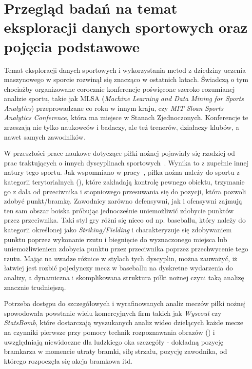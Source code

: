 
\chapter{Przegląd badań na temat eksploracji danych sportowych oraz pojęcia podstawowe}
Temat eksploracji danych sportowych i wykorzystania metod z dziedziny uczenia maszynowego w sporcie rozwinął się znacząco w ostatnich latach. Świadczą o tym chociażby organizowane corocznie konferencje poświęcone szeroko rozumianej analizie sportu, takie jak MLSA (\textit{Machine Learning and Data Mining for Sports Analytics}) przeprowadzane co roku w innym kraju, czy \textit{MIT Sloan Sports Analytics Conference}, która ma miejsce w Stanach Zjednoczonych. Konferencje te zrzeszają nie tylko naukowców i badaczy, ale też trenerów, działaczy klubów, a nawet samych zawodników.

W przeszłości prace naukowe dotyczące piłki nożnej pojawiały się rzadziej od prac traktujących o innych dyscyplinach sportowych~\cite{ml_soccer_analytics}. Wynika to z zupełnie innej natury tego sportu. Jak wspomniano w pracy~\cite{game_classification}, piłka nożna należy do sportu z kategorii terytorialnych (), które zakładają kontrolę pewnego obiektu, trzymanie go z dala od przeciwnika i stopniowego przesuwania się do pozycji, która pozwoli zdobyć punkt/bramkę. Zawodnicy zarówno defensywni, jak i ofensywni zajmują ten sam obszar boiska próbując jednocześnie uniemożliwić zdobycie punktów przez przeciwnika. Taki styl gry różni się nieco od np. baseballu, który należy do kategorii określonej jako \textit{Striking/Fielding} i charakteryzuje się zdobywaniem punktu poprzez wykonanie rzutu i biegnięcie do wyznaczonego miejsca lub uniemożliwieniem zdobycia punktu przez przeciwnika poprzez przechwycenie tego rzutu. Mając na uwadze różnice w stylach tych dyscyplin, można zauważyć, iż łatwiej jest rozbić pojedynczy mecz w baseballu na dyskretne wydarzenia do analizy, a dynamiczna i skomplikowana struktura piłki nożnej czyni taką analizę znacznie trudniejszą.

Potrzeba dostępu do szczegółowych i wyrafinowanych analiz meczów piłki nożnej spowodowała powstanie wielu komercyjnych firm takich jak \textit{Wyscout} czy \textit{StatsBomb}, które dostarczają wyszukanych analiz wideo dzielących każde mecze na czynniki pierwsze przy pomocy technik rozpoznawania obrazów () i uwzględniają niewidoczne dla ludzkiego oka szczegóły - dokładną pozycję bramkarza w momencie utraty bramki, siłę strzału, pozycję zawodnika, od którego rozpoczęła się akcja bramkowa itd.


